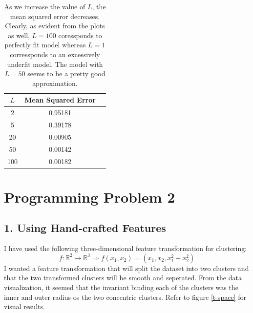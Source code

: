 \documentclass[a4paper,11pt]{article}
\begin{document}
\begin{mlsolution}
\begin{table}[!htbp]
	\label{tab-2a}
	\begin{center}
		\begin{tabular}{|c|c|c|}
			\hline
			\hspace{4mm}$L$\hspace{4mm} & \hspace{4mm}\textbf{Mean Squared Error}\hspace{4mm} \\
			\hline
			\hline
			2 & 0.95181 \\
			\hline
			5 & 0.39178 \\ 
			\hline
			20 & 0.00905 \\
			\hline
			50 & 0.00142 \\
			\hline
			100 & 0.00182 \\
			\hline
		\end{tabular}
	\end{center}
	\caption[MSE for Landmark-ridge]{As we increase the value of $L$, the mean squared error decreases. Clearly, as evident from the plots as well, $L = 100$ coressponds to perfectly fit model whereas $L = 1$ corressponds to an excessively underfit model. The model with $L = 50$ seems to be a pretty good approximation.}
\end{table}


\section{Programming Problem 2}
\subsection{1. Using Hand-crafted Features}
I have used the following three-dimensional feature transformation for clustering:
\[
f: \mathbb{R}^{2} \rightarrow \mathbb{R}^{3} \Rightarrow f(x_1, x_2) = (x_1, x_2, x^{2}_{1}+x^{2}_{2})
\]
I wanted a feature transformation that will split the dataset into two clusters and that the two transformed clusters will be smooth and seperated. From the data visualization, it seemed that the invariant binding each of the clusters was the inner and outer radius os the two concentric clusters. Refer to figure \ref{t-space} for visual results.

\begin{figure}[!htbp]
	

\end{figure}
\end{mlsolution}
\end{document}
